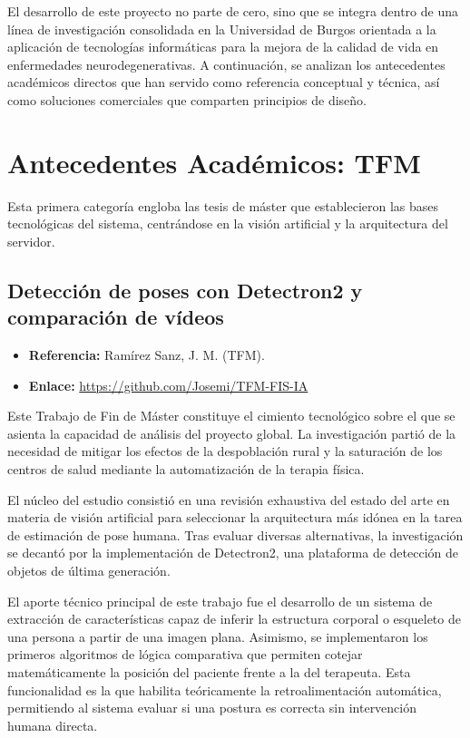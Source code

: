 
El desarrollo de este proyecto no parte de cero, sino que se integra dentro de una línea de investigación consolidada en la Universidad de Burgos orientada a la aplicación de tecnologías informáticas para la mejora de la calidad de vida en enfermedades neurodegenerativas. A continuación, se analizan los antecedentes académicos directos que han servido como referencia conceptual y técnica, así como soluciones comerciales que comparten principios de diseño.

\section{Antecedentes Académicos: TFM}

Esta primera categoría engloba las tesis de máster que establecieron las bases tecnológicas del sistema, centrándose en la visión artificial y la arquitectura del servidor.

\subsection{Detección de poses con Detectron2 y comparación de vídeos}

\begin{itemize}
    \item \textbf{Referencia:} Ramírez Sanz, J. M. (TFM).
    \item \textbf{Enlace:} \url{https://github.com/Josemi/TFM-FIS-IA}
\end{itemize}

Este Trabajo de Fin de Máster constituye el cimiento tecnológico sobre el que se asienta la capacidad de análisis del proyecto global. La investigación partió de la necesidad de mitigar los efectos de la despoblación rural y la saturación de los centros de salud mediante la automatización de la terapia física.

El núcleo del estudio consistió en una revisión exhaustiva del estado del arte en materia de visión artificial para seleccionar la arquitectura más idónea en la tarea de estimación de pose humana. Tras evaluar diversas alternativas, la investigación se decantó por la implementación de Detectron2, una plataforma de detección de objetos de última generación.

El aporte técnico principal de este trabajo fue el desarrollo de un sistema de extracción de características capaz de inferir la estructura corporal o esqueleto de una persona a partir de una imagen plana. Asimismo, se implementaron los primeros algoritmos de lógica comparativa que permiten cotejar matemáticamente la posición del paciente frente a la del terapeuta. Esta funcionalidad es la que habilita teóricamente la retroalimentación automática, permitiendo al sistema evaluar si una postura es correcta sin intervención humana directa.

